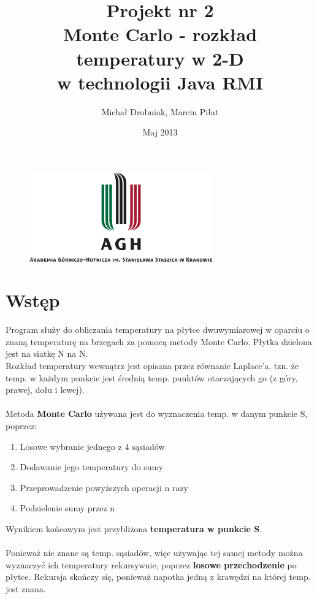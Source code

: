 \documentclass[11pt,a4paper]{article}
\begin{document}
\title{\LARGE  Projekt nr 2 \\ \vspace{0.4cm} \textbf{Monte Carlo - rozkład temperatury w 2-D}\\ w technologii Java RMI}
\author{Michał Drobniak, 
 Marcin Piłat }
\date{Maj 2013}
\maketitle

\vfill
\begin{figure}[H]
\begin{center}
\includegraphics[width=0.7\textwidth]{agh_nzw_s_pl_1w_wbr_rgb_150ppi.jpg}
\end{center}
\end{figure}
\newpage

\section{Wstęp}

Program służy do obliczania temperatury na płytce dwuwymiarowej w oparciu o znaną temperaturę na brzegach za pomocą metody Monte Carlo. Płytka dzielona jest na siatkę N na N.\\
Rozkład temperatury wewnątrz jest opisana przez równanie Laplace'a, tzn. że temp. w każdym punkcie jest średnią temp. punktów otaczających go (z góry, prawej, dołu i lewej).\\
\\
Metoda \textbf{Monte Carlo} używana jest do wyznaczenia temp. w danym punkcie S, poprzez:
\begin{enumerate}
	\item Losowe wybranie jednego z 4 sąsiadów
	\item Dodawanie jego temperatury do sumy
	\item Przeprowadzenie powyższych operacji n razy
	\item Podzielenie sumy przez n
\end{enumerate}
Wynikiem końcowym jest przybliżona \textbf{temperatura w punkcie S}.\\
\\
Ponieważ nie znane są temp. sąsiadów, więc używając tej samej metody można wyznaczyć ich temperatury rekursywnie, poprzez \textbf{losowe przechodzenie} po płytce. Rekursja skończy się, ponieważ napotka jedną z krawędzi na której temp. jest znana.
\end{document}
